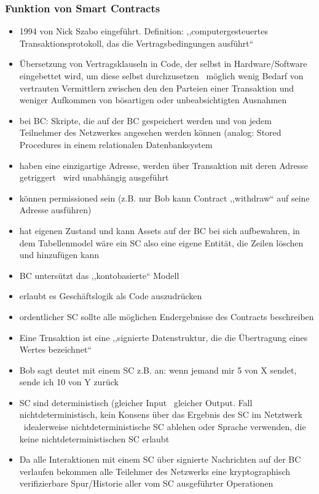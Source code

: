     \subsubsection*{Funktion von Smart Contracts}
        \begin{itemize}
            \item 1994 von Nick Szabo eingeführt. Definition: ,,computergesteuertes Transaktionsprotokoll, das die Vertragsbedingungen ausführt``\cite{Szabo1996}
            \item Übersetzung von Vertragsklauseln in Code, der selbst in Hardware/Software eingebettet wird, um diese selbst durchzusetzen \textrightarrow\ möglich wenig Bedarf von vertrauten Vermittlern zwischen den den Parteien einer Transaktion und weniger Aufkommen von bösartigen oder unbeabsichtigten Ausnahmen
            \item bei BC: Skripte, die auf der BC gespeichert werden und von jedem Teilnehmer des Netzwerkes angesehen werden können (analog: Stored Procedures in einem relationalen Datenbanksystem
            \item haben eine einzigartige Adresse, werden über Transaktion mit deren Adresse getriggert \textrightarrow\ wird unabhängig ausgeführt
            \item können permissioned sein (z.B. nur Bob kann Contract ,,withdraw`` auf seine Adresse ausführen)
            \item hat eigenen Zustand und kann Assets auf der BC bei sich aufbewahren, in dem Tabellenmodel wäre ein SC also eine eigene Entität, die Zeilen löschen und hinzufügen kann
            \item BC untersützt das ,,kontobasierte`` Modell
            \item erlaubt es Geschäftslogik als Code auszudrücken
            \item ordentlicher SC sollte alle möglichen Endergebnisse des Contracts beschreiben
            \item Eine Trnsaktion ist eine ,,signierte Datenstruktur, die die Übertragung eines Wertes bezeichnet``\cite{Christidis2016}
            \item Bob sagt deutet mit einem SC z.B. an: wenn jemand mir 5 von X sendet, sende ich 10 von Y zurück
            \item SC sind deterministisch (gleicher Input \textrightarrow\ gleicher Output. Fall nichtdeterministisch, kein Konsens über das Ergebnis des SC im Netztwerk \textrightarrow\ idealerweise nichtdeterministische SC ablehen oder Sprache verwenden, die keine nichtdeterministischen SC erlaubt
            \item Da alle Interaktionen mit einem SC über signierte Nachrichten auf der BC verlaufen bekommen alle Teilehmer des Netzwerks eine kryptographisch verifizierbare Spur/Historie aller vom SC ausgeführter Operationen
        \end{itemize}
        

